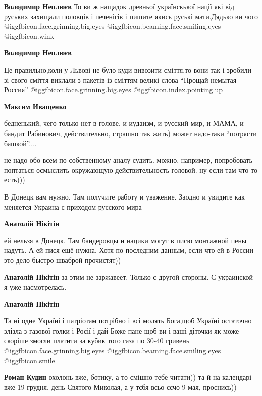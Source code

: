 \begin{itemize}
\begin{itemize}
\textbf{Володимир Неплюєв} То ви ж нащадок древньої українскької нації які від руських захищали половців і печенігів і пишите якись руські мати.Дядько ви чого @igg{fbicon.face.grinning.big.eyes}  @igg{fbicon.beaming.face.smiling.eyes}  @igg{fbicon.wink} 

\textbf{Володимир Неплюєв} 

Це правильно,коли у Львові не було куди вивозити сміття,то вони так і зробили
зі свого сміття виклали з пакетів із сміттям великі слова \enquote{Прощай немытая
Россия} @igg{fbicon.face.grinning.big.eyes} @igg{fbicon.index.pointing.up}

\textbf{Максим Иващенко} 

бедненький, чего только нет в голове, и иудаизм, и русский мир, и МАМА, и
бандит Рабинович, действительно, страшно так жить) может надо-таки \enquote{потрясти
башкой}....


не надо обо всем по собственному аналу судить. можно, например, попробовать
поптаться осмыслить окружающую действительность головой. ну если там что-то
есть)))

\end{itemize} %


В Донецк вам нужно. Там получите работу и уважение. Заодно и увидите как
меняется Украина с приходом русского мира

\begin{itemize} %
\textbf{Анатолій Нікітін} 

ей нельзя в Донецк. Там бандеровцы и нацики могут в писю монтажной пены надуть. А
ей пися ещё нужна. Хотя по последним данным, если что ей в России это дело быстро
шваброй прочистят))

\textbf{Анатолій Нікітін} за этим не заржавеет. Только с другой стороны. С украинской я уже насмотрелась.

\textbf{Анатолій Нікітін} 

Та ні одне Україні і патріотам потрібно і всі молять Бога,щоб Україні остаточно
злізла з газової голки і Росії і дай Боже пане щоб ви і ваші діточки як може
скоріше змогли платити за кубик того газа по 30-40 гривень @igg{fbicon.face.grinning.big.eyes}  @igg{fbicon.beaming.face.smiling.eyes}  @igg{fbicon.smile} 


\textbf{Роман Кудин} охолонь вже, ботику, а то смішно тебе читати)) та й на календарі вже 19 грудня, день Святого Миколая, а у тєбя всьо єсчо 9 мая, проснись))


\end{itemize}
\end{itemize}
